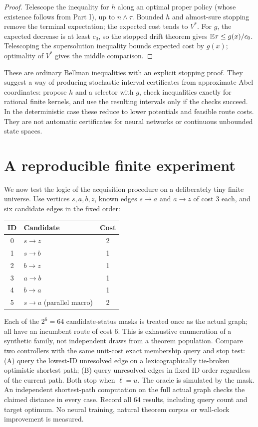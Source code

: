 \documentclass[11pt]{article}
\theoremstyle{definition}\newtheorem{definition}[theorem]{Definition}\newtheorem{example}[theorem]{Example}\newtheorem{conjecture}[theorem]{Conjecture}
\begin{document}
\begin{proof} Telescope the inequality for $h$ along an optimal proper policy (whose existence follows from Part I), up to $n\wedge\tau$. Bounded $h$ and almost-sure stopping remove the terminal expectation; the expected cost tends to $V^*$. For $g$, the expected decrease is at least $c_0$, so the stopped drift theorem gives $\mathbb E\tau\le g(x)/c_0$. Telescoping the supersolution inequality bounds expected cost by $g(x)$; optimality of $V^*$ gives the middle comparison.\end{proof}
These are ordinary Bellman inequalities with an explicit stopping proof. They suggest a way of producing stochastic interval certificates from approximate Abel coordinates: propose $h$ and a selector with $g$, check inequalities exactly for rational finite kernels, and use the resulting intervals only if the checks succeed. In the deterministic case these reduce to lower potentials and feasible route costs. They are not automatic certificates for neural networks or continuous unbounded state spaces.
\section{A reproducible finite experiment}\label{sec:experiment}
We now test the logic of the acquisition procedure on a deliberately tiny finite universe. Use vertices $s,a,b,z$, known edges $s\to a$ and $a\to z$ of cost 3 each, and six candidate edges in the fixed order:
\begin{center}\begin{tabular}{clc}\toprule ID&Candidate&Cost\\\midrule
0&$s\to z$&2\\1&$s\to b$&1\\2&$b\to z$&1\\3&$a\to b$&1\\4&$b\to a$&1\\5&$s\to a$ (parallel macro)&2\\\bottomrule\end{tabular}\end{center}
Each of the $2^6=64$ candidate-status masks is treated once as the actual graph; all have an incumbent route of cost 6. This is exhaustive enumeration of a synthetic family, not independent draws from a theorem population. Compare two controllers with the same unit-cost exact membership query and stop test: (A) query the lowest-ID unresolved edge on a lexicographically tie-broken optimistic shortest path; (B) query unresolved edges in fixed ID order regardless of the current path. Both stop when $\ell=u$. The oracle is simulated by the mask. An independent shortest-path computation on the full actual graph checks the claimed distance in every case. Record all 64 results, including query count and target optimum. No neural training, natural theorem corpus or wall-clock improvement is measured.
\end{document}
